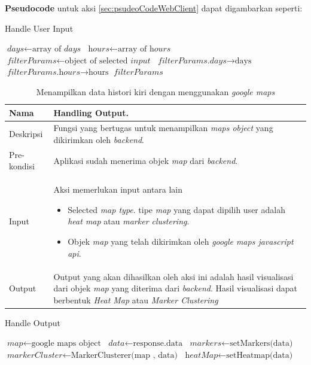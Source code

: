 \textbf{Pseudocode} untuk aksi \ref{sec:psudeoCodeWebClient} dapat digambarkan seperti:
\begin{algorithm}
\caption{Handle User Input}\label{euclid}
\begin{algorithmic}[1]
\State $\textit{days} \gets \text{array of }\textit{days}$
\State $\textit{hours} \gets \text{array of }\textit{hours}$
\State $\textit{filterParams} \gets \text{object of selected }\textit{input}$
\State $\textit{filterParams.days} \rightarrow \text{days}$
\State $\textit{filterParams.hours} \rightarrow \text{hours}$
\State \Return $\textit{filterParams} $
\end{algorithmic}
\end{algorithm}


\begin{table}[H]
    \centering
       \caption{Menampilkan data histori kiri dengan menggunakan \textit{google maps}}
    \begin{tabular}{|p{3cm}|p{10cm}|}
    \hline
        Nama & Handling Output.\\
    \hline
    \hline
        Deskripsi & Fungsi yang bertugas untuk menampilkan \textit{maps object} yang dikirimkan oleh \textit{backend}.
        \\
    \hline
        Pre-kondisi & Aplikasi sudah menerima objek \textit{map} dari \textit{backend}.\\
    \hline
        Input & 
        Aksi memerlukan input antara lain 
        \begin{itemize}
            \item Selected \textit{map type}. tipe \textit{map} yang dapat dipilih user adalah \textit{heat map} atau \textit{marker clustering}.
            \item Objek \textit{map} yang telah dikirimkan oleh \textit{google maps javascript api}.
        \end{itemize}
       \\
       \hline
        Output & 
        Output yang akan dihasilkan oleh aksi ini adalah hasil visualisasi dari objek \textit{map} yang diterima dari \textit{backend}. Hasil visualisasi dapat berbentuk \textit{Heat Map} atau \textit{Marker Clustering}
       \\
    \hline
    \end{tabular}
\end{table}

\begin{algorithm}[htbp]
\caption{Handle Output}
\begin{algorithmic}[1]
\State $\textit{map} \gets \text{google maps object}$
\State $\textit{data} \gets \text{response.data}$
    \State $\textit{markers} \gets \text{setMarkers(data)}$
    \State $\textit{markerCluster} \gets \text{MarkerClusterer(map , data)}$
\Else
    \State $\textit{heatMap} \gets \text{setHeatmap(data)}$
\EndIf
\EndProcedure
\end{algorithmic}
\end{algorithm}


